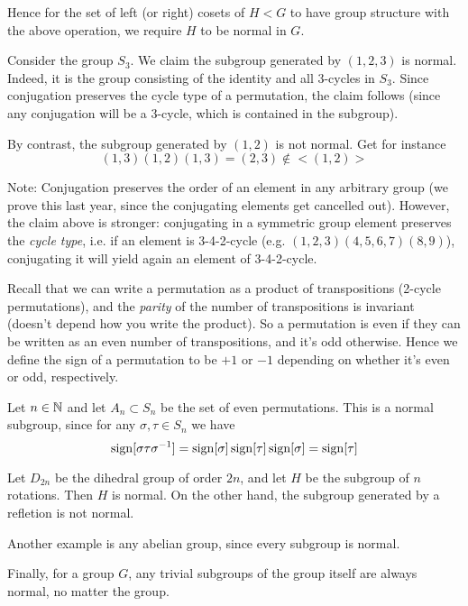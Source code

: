 Hence for the set of left (or right) cosets of $H<G$ to have group structure with the
above operation, we require $H$ to be normal in $G$.

\begin{example}
  Consider the group $S_3$. We claim the subgroup generated by $(1,2,3)$ is normal.
  Indeed, it is the group consisting of the identity and all 3-cycles in $S_3$. Since
  conjugation preserves the cycle type of a permutation, the claim follows (since any
  conjugation will be a 3-cycle, which is contained in the subgroup).

  By contrast, the subgroup generated by $(1,2)$ is not normal. Get for instance
  \[(1,3)(1,2)(1,3)=(2,3)\not\in<(1,2)>\]

\end{example}

Note: Conjugation preserves the order of an element in any arbitrary group (we prove this
last year, since the conjugating elements get cancelled out). However, the claim above is
stronger: conjugating in a symmetric group element preserves the \emph{cycle type}, i.e.
if an element is 3-4-2-cycle (e.g. $(1,2,3)(4,5,6,7)(8,9)$), conjugating it will yield
again an element of 3-4-2-cycle.

\begin{example}
  Recall that we can write a permutation as a product of transpositions (2-cycle
  permutations), and the \emph{parity} of the number of transpositions is invariant
  (doesn't depend how you write the product). So a permutation is even if they can be
  written as an even number of transpositions, and it's odd otherwise. Hence we define the
  sign of a permutation to be $+1$ or $-1$ depending on whether it's even or odd,
  respectively.

  Let $n\in\mathbb N$ and let $A_n\subset S_n$ be the set of even permutations. This is a normal
  subgroup, since for any $\sigma, \tau\in S_n$ we have
  \[\operatorname{sign} [\sigma \tau \sigma^{-1}] =
  \operatorname{sign}[\sigma]\operatorname{sign}[\tau]\operatorname{sign}[\sigma]=\operatorname{sign}[\tau]\]
\end{example}

\begin{example}
  Let $D_{2n}$ be the dihedral group of order $2n$, and let $H$ be the subgroup of $n$
  rotations. Then $H$ is normal. On the other hand, the subgroup generated by a refletion
  is not normal.

  Another example is any abelian group, since every subgroup is normal.

  Finally, for a group $G$, any trivial subgroups of the group itself are always normal,
  no matter the group.
\end{example}

